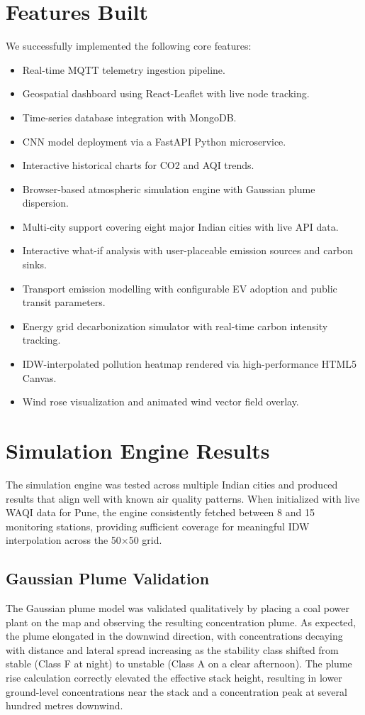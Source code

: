 \documentclass[a4paper, 12pt]{report}
\begin{document}
\section{Features Built}
We successfully implemented the following core features:
\begin{itemize}
	\item Real-time MQTT telemetry ingestion pipeline.
	\item Geospatial dashboard using React-Leaflet with live node tracking.
	\item Time-series database integration with MongoDB.
	\item CNN model deployment via a FastAPI Python microservice.
	\item Interactive historical charts for CO2 and AQI trends.
	\item Browser-based atmospheric simulation engine with Gaussian plume dispersion.
	\item Multi-city support covering eight major Indian cities with live API data.
	\item Interactive what-if analysis with user-placeable emission sources and carbon sinks.
	\item Transport emission modelling with configurable EV adoption and public transit parameters.
	\item Energy grid decarbonization simulator with real-time carbon intensity tracking.
	\item IDW-interpolated pollution heatmap rendered via high-performance HTML5 Canvas.
	\item Wind rose visualization and animated wind vector field overlay.
\end{itemize}

\section{Simulation Engine Results}
The simulation engine was tested across multiple Indian cities and produced results that align well with known air quality patterns. When initialized with live WAQI data for Pune, the engine consistently fetched between 8 and 15 monitoring stations, providing sufficient coverage for meaningful IDW interpolation across the 50$\times$50 grid.

\subsection{Gaussian Plume Validation}
The Gaussian plume model was validated qualitatively by placing a coal power plant on the map and observing the resulting concentration plume. As expected, the plume elongated in the downwind direction, with concentrations decaying with distance and lateral spread increasing as the stability class shifted from stable (Class F at night) to unstable (Class A on a clear afternoon). The plume rise calculation correctly elevated the effective stack height, resulting in lower ground-level concentrations near the stack and a concentration peak at several hundred metres downwind.
\end{document}
